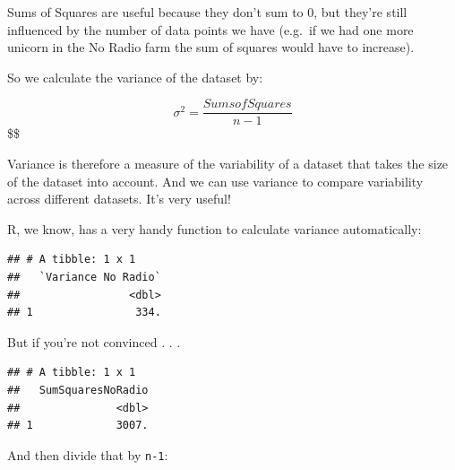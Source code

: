 \documentclass[
]{book}
\newenvironment{Shaded}{\begin{snugshade}}{\end{snugshade}}
\newcommand{\DataTypeTok}[1]{\textcolor[rgb]{0.13,0.29,0.53}{#1}}
\newcommand{\KeywordTok}[1]{\textcolor[rgb]{0.13,0.29,0.53}{\textbf{#1}}}
\newcommand{\NormalTok}[1]{#1}
\newcommand{\OperatorTok}[1]{\textcolor[rgb]{0.81,0.36,0.00}{\textbf{#1}}}
\newcommand{\StringTok}[1]{\textcolor[rgb]{0.31,0.60,0.02}{#1}}
\begin{document}
Sums of Squares are useful because they don't sum to 0, but they're still influenced by the number of data points we have (e.g.~if we had one more unicorn in the No Radio farm the sum of squares would have to increase).

So we calculate the variance of the dataset by:

\[\sigma^2 = \frac{SumsofSquares}{n-1} \] \$\$

Variance is therefore a measure of the variability of a dataset that takes the size of the dataset into account. And we can use variance to compare variability across different datasets. It's very useful!

R, we know, has a very handy function to calculate variance automatically:

\begin{Shaded}
\end{Shaded}

\begin{verbatim}
## # A tibble: 1 x 1
##   `Variance No Radio`
##                 <dbl>
## 1                334.
\end{verbatim}

But if you're not convinced . . .

\begin{Shaded}
\end{Shaded}

\begin{verbatim}
## # A tibble: 1 x 1
##   SumSquaresNoRadio
##               <dbl>
## 1             3007.
\end{verbatim}

And then divide that by \texttt{n-1}:
\end{document}
